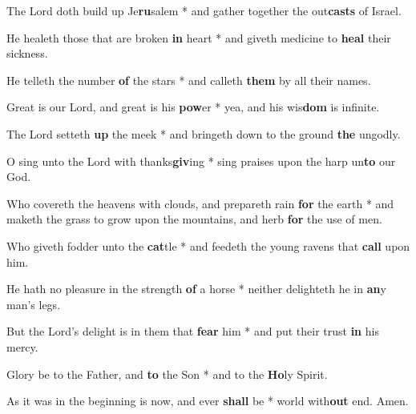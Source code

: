 \begin{multicols}{2}
	The Lord doth build up Je\textbf{ru}salem * and gather together the out\textbf{casts} of Israel.
	
	He healeth those that are broken \textbf{in} heart * and giveth medicine to \textbf{heal} their sickness.
	
	He telleth the number \textbf{of} the stars * and calleth \textbf{them} by all their names.
	
	Great is our Lord, and great is his \textbf{pow}er * yea, and his wis\textbf{dom} is infinite.
	
	The Lord setteth \textbf{up} the meek * and bringeth down to the ground \textbf{the} ungodly.
	
	O sing unto the Lord with thanks\textbf{giv}ing * sing praises upon the harp un\textbf{to} our God.
	
	Who covereth the heavens with clouds, and prepareth rain \textbf{for} the earth * and maketh the grass to grow upon the mountains, and herb \textbf{for} the use of men.
	
	Who giveth fodder unto the \textbf{cat}tle * and feedeth the young ravens that \textbf{call} upon him.
	
	He hath no pleasure in the strength \textbf{of} a horse * neither delighteth he in \textbf{an}y man's legs.
	
	But the Lord's delight is in them that \textbf{fear} him * and put their trust \textbf{in} his mercy.
	
	Glory be to the Father, and \textbf{to} the Son * and to the \textbf{Ho}ly Spirit.
	
	As it was in the beginning is now, and ever \textbf{shall} be * world with\textbf{out} end. Amen.
\end{multicols}